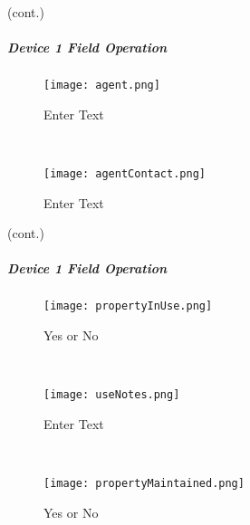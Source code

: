  {\footnotesize (cont.)}
 
 
  \vspace{.5in}

 
 \vspace{4in}

 
 \clearpage
 
 \subparagraph*{Device 1 Field Operation}
 \begin{wrapfigure}{r}{0.6\textwidth}
 \centering
     \texttt{[image: agent.png]}
     \vspace{-.1in}
     
 \caption{Enter Text}
 \vspace{.05in}

 \HRule \\[.4cm] %
 \vspace{.05in}

     \texttt{[image: agentContact.png]}
     \vspace{-.1in}
     
 \caption{Enter Text}
 \end{wrapfigure}
 {\footnotesize (cont.)}



 \vspace{5.5in}


 \clearpage


 \subparagraph*{Device 1 Field Operation}
 \begin{wrapfigure}{r}{0.6\textwidth}
 \centering
     \texttt{[image: propertyInUse.png]}
 \caption {Yes or No}
 \vspace{.05in}

 \HRule \\[.4cm] %
 \vspace{.1in}

     \texttt{[image: useNotes.png]}
 \caption {Enter Text}
 \vspace{.05in}

 \HRule \\[.4cm] %
 \vspace{.1in}

     \texttt{[image: propertyMaintained.png]}
 \caption{Yes or No}
 \end{wrapfigure}

